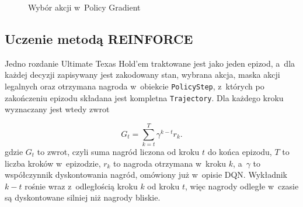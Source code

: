 \begin{figure}[htbp]
    \centering
    \caption{Wybór akcji w~Policy Gradient}
    \label{fig:policy-action-selection}
\end{figure}

\subsection{Uczenie metodą REINFORCE}

Jedno rozdanie Ultimate Texas Hold'em traktowane jest jako jeden epizod,
a~dla każdej decyzji zapisywany jest zakodowany stan, wybrana akcja, maska
akcji legalnych oraz otrzymana nagroda w~obiekcie \texttt{PolicyStep},
z~których po zakończeniu epizodu składana jest kompletna \texttt{Trajectory}.
Dla każdego kroku wyznaczany jest wtedy zwrot

\begin{equation}
    G_t =
    \sum_{k=t}^{T}
    \gamma^{k-t} r_k.
\end{equation}
gdzie $G_t$ to zwrot, czyli suma nagród liczona od kroku $t$ do końca
epizodu, $T$ to liczba kroków w~epizodzie, $r_k$ to nagroda otrzymana
w~kroku $k$, a~$\gamma$ to współczynnik dyskontowania nagród, omówiony
już w~opisie DQN. Wykładnik $k-t$ rośnie
wraz z~odległością kroku $k$ od kroku $t$, więc nagrody odległe
w~czasie są dyskontowane silniej niż nagrody bliskie.

